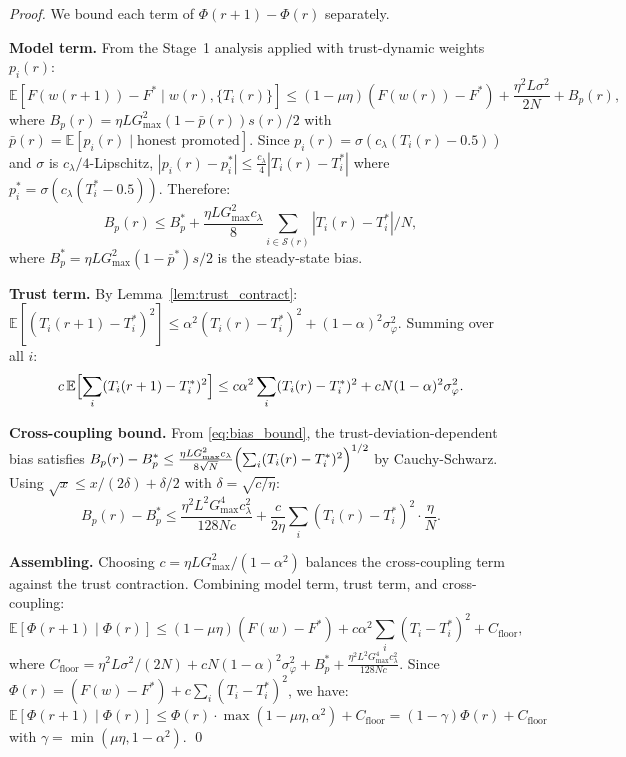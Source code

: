 \documentclass{article}
\newcommand{\E}{\mathbb{E}}
\newcommand{\calS}{\mathcal{S}}
\newcommand{\LyapV}{\Phi}
\begin{document}
\begin{proof}
We bound each term of $\LyapV(r+1) - \LyapV(r)$ separately.

\textbf{Model term.}
From the Stage~1 analysis applied with trust-dynamic weights $p_i(r)$:
\[
  \E[F(w(r+1)) - F^* \mid w(r), \{T_i(r)\}]
  \leq (1-\mu\eta)(F(w(r)) - F^*)
  + \frac{\eta^2 L\sigma^2}{2N}
  + B_p(r),
\]
where $B_p(r) = \eta L G_{\max}^2 (1-\bar{p}(r)) s(r) / 2$ with
$\bar{p}(r) = \E[p_i(r) \mid \text{honest promoted}]$.
Since $p_i(r) = \sigma(c_\lambda(T_i(r) - 0.5))$ and $\sigma$ is
$c_\lambda/4$-Lipschitz, $|p_i(r) - p_i^*| \leq \frac{c_\lambda}{4}|T_i(r) - T_i^*|$
where $p_i^* = \sigma(c_\lambda(T_i^* - 0.5))$.
Therefore:
\begin{equation}
  B_p(r) \leq B_p^* + \frac{\eta L G_{\max}^2 c_\lambda}{8}
  \sum_{i \in \calS(r)} |T_i(r) - T_i^*| / N,
  \label{eq:bias_bound}
\end{equation}
where $B_p^* = \eta L G_{\max}^2(1-\bar{p}^*)s/2$ is the steady-state bias.

\textbf{Trust term.}
By Lemma~\ref{lem:trust_contract}:
$\E[(T_i(r+1) - T_i^*)^2] \leq \alpha^2(T_i(r) - T_i^*)^2 + (1-\alpha)^2\sigma_\varphi^2$.
Summing over all $i$:
\begin{equation}
  c\,\E\Bigl[\sum_i (T_i(r+1) - T_i^*)^2\Bigr]
  \leq c\alpha^2 \sum_i(T_i(r)-T_i^*)^2 + cN(1-\alpha)^2\sigma_\varphi^2.
  \label{eq:trust_descent}
\end{equation}

\textbf{Cross-coupling bound.}
From \eqref{eq:bias_bound}, the trust-deviation-dependent bias satisfies
$B_p(r) - B_p^* \leq \frac{\eta L G_{\max}^2 c_\lambda}{8\sqrt{N}}
\Bigl(\sum_i(T_i(r) - T_i^*)^2\Bigr)^{1/2}$
by Cauchy-Schwarz.
Using $\sqrt{x} \leq x/(2\delta) + \delta/2$ with $\delta = \sqrt{c/\eta}$:
\begin{equation}
  B_p(r) - B_p^* \leq
  \frac{\eta^2 L^2 G_{\max}^4 c_\lambda^2}{128 Nc}
  + \frac{c}{2\eta}\sum_i(T_i(r) - T_i^*)^2 \cdot \frac{\eta}{N}.
  \label{eq:cross_couple}
\end{equation}

\textbf{Assembling.}
Choosing $c = \eta L G_{\max}^2 / (1-\alpha^2)$ balances the cross-coupling
term against the trust contraction.
Combining model term, trust term, and cross-coupling:
\[
  \E[\LyapV(r+1) \mid \LyapV(r)]
  \leq (1-\mu\eta)(F(w)-F^*)
  + c\alpha^2 \sum_i(T_i-T_i^*)^2
  + C_{\mathrm{floor}},
\]
where $C_{\mathrm{floor}} = \eta^2 L\sigma^2/(2N) + cN(1-\alpha)^2\sigma_\varphi^2
+ B_p^* + \frac{\eta^2 L^2 G_{\max}^4 c_\lambda^2}{128Nc}$.
Since $\LyapV(r) = (F(w)-F^*) + c\sum_i(T_i-T_i^*)^2$, we have:
$\E[\LyapV(r+1) \mid \LyapV(r)] \leq \LyapV(r)\cdot\max(1-\mu\eta, \alpha^2) + C_{\mathrm{floor}}
= (1-\gamma)\LyapV(r) + C_{\mathrm{floor}}$
with $\gamma = \min(\mu\eta, 1-\alpha^2)$.
\qed
\end{proof}
\end{document}
